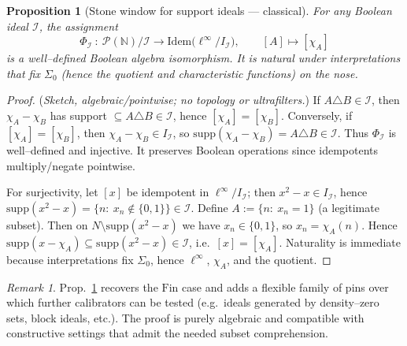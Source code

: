 \documentclass[11pt]{article}
\newtheorem{proposition}[theorem]{Proposition}
\theoremstyle{definition}
\theoremstyle{remark}
\newtheorem{remark}[theorem]{Remark}
\newcommand{\linf}{\ell^\infty}
\begin{document}
\begin{proposition}[Stone window for support ideals — classical]\label{VI:prop:stone-general}
For any Boolean ideal \(\mathcal I\), the assignment
\[
\Phi_{\mathcal I}\ :\ \mathcal P(\mathbb N)/\mathcal I \longrightarrow \mathrm{Idem}\big(\linf/I_{\mathcal I}\big),
\qquad [A]\longmapsto[\chi_A]
\]
is a well–defined Boolean algebra isomorphism. It is natural under interpretations that fix \(\Sigma_0\) (hence the quotient and characteristic functions) on the nose.
\end{proposition}

\begin{proof}
(\emph{Sketch, algebraic/pointwise; no topology or ultrafilters.})
If \(A\triangle B\in\mathcal I\), then \(\chi_A-\chi_B\) has support \(\subseteq A\triangle B\in\mathcal I\), hence \([\chi_A]=[\chi_B]\).
Conversely, if \([\chi_A]=[\chi_B]\), then \(\chi_A-\chi_B\in I_{\mathcal I}\), so \(\mathrm{supp}(\chi_A-\chi_B)=A\triangle B\in\mathcal I\).
Thus \(\Phi_{\mathcal I}\) is well–defined and injective. It preserves Boolean operations since idempotents multiply/negate pointwise.

For surjectivity, let \([x]\) be idempotent in \(\linf/I_{\mathcal I}\); then \(x^2-x\in I_{\mathcal I}\), hence
\(\mathrm{supp}(x^2-x)=\{n:\ x_n\notin\{0,1\}\}\in\mathcal I\).
Define \(A:=\{n:\ x_n=1\}\) (a legitimate subset). Then on \(N\setminus \mathrm{supp}(x^2-x)\) we have \(x_n\in\{0,1\}\), so \(x_n=\chi_A(n)\).
Hence \(\mathrm{supp}(x-\chi_A)\subseteq \mathrm{supp}(x^2-x)\in\mathcal I\), i.e.\ \([x]=[\chi_A]\). Naturality is immediate because interpretations fix \(\Sigma_0\), hence \(\linf\), \(\chi_A\), and the quotient.
\end{proof}

\begin{remark}
Prop.~\ref{VI:prop:stone-general} recovers the \(\mathrm{Fin}\) case and adds a flexible family of pins over which further calibrators can be tested (e.g.\ ideals generated by density–zero sets, block ideals, etc.). The proof is purely algebraic and compatible with constructive settings that admit the needed subset comprehension.
\end{remark}
\end{document}
